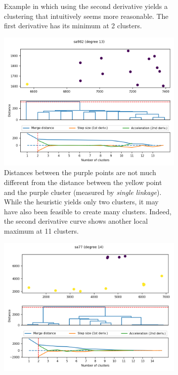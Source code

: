 \documentclass[
	fontsize=10pt, %
	twoside=false, %
	secnumdepth=1, %
  toc=indentunnumbered %
]{kaobook}
\begin{document}
\begin{figure}[h]
\begin{subfigure}{0.48\linewidth}
    \caption{Example in which using the second derivative yields a clustering
      that intuitively seems more reasonable. The first derivative has its
      minimum
      at 2 clusters. 
    }
  \end{subfigure}
      \begin{subfigure}{0.48\linewidth}
        \includegraphics[width=\textwidth]{dendrograms/sa982.png}
        \caption{
          Distances between the purple points are not much
          different from the distance between the yellow point and the purple
          cluster (measured by \textit{single linkage}). While the heuristic yields
          only two clusters, it may have also been feasible to create many clusters.
          Indeed, the second derivative curve shows another local maximum at 11 clusters.
        }
      \end{subfigure}
      \begin{subfigure}{0.48\linewidth}
        \includegraphics[width=\textwidth]{dendrograms/sa77-variance.png}

\end{subfigure}
\end{figure}
\end{document}
